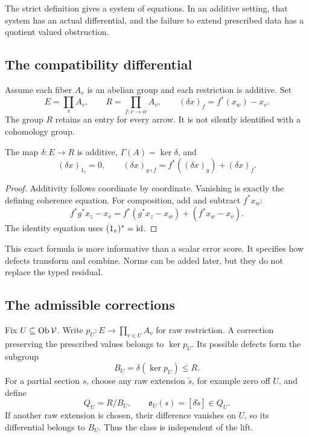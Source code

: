\label{sec:obstruction}
The strict definition gives a system of equations. In an additive setting, that system has an actual differential, and the failure to extend prescribed data has a quotient valued obstruction.

\subsection{The compatibility differential}
Assume each fiber \(A_v\) is an abelian group and each restriction is additive. Set
\[
 E=\prod_v A_v,\qquad R=\prod_{f:v\to w}A_v,
 \qquad (\delta x)_f=f^*(x_w)-x_v.
\]
The group \(R\) retains an entry for every arrow. It is not silently identified with a cohomology group.

\begin{proposition}\label{KS08}
The map \(\delta:E\to R\) is additive, \(\Gamma(A)=\ker\delta\), and
\[
 (\delta x)_{1_v}=0,\qquad
 (\delta x)_{g\circ f}=f^*((\delta x)_g)+(\delta x)_f.
\]
\end{proposition}
\begin{proof}
Additivity follows coordinate by coordinate. Vanishing is exactly the defining coherence equation. For composition, add and subtract \(f^*x_w\):
\[
 f^*g^*x_z-x_v
 =f^*(g^*x_z-x_w)+(f^*x_w-x_v).
\]
The identity equation uses \((1_v)^*=\operatorname{id}\).
\end{proof}
This exact formula is more informative than a scalar error score. It specifies how defects transform and combine. Norms can be added later, but they do not replace the typed residual.

\subsection{The admissible corrections}
Fix \(U\subseteq\operatorname{Ob}\mathcal V\). Write \(p_U:E\to\prod_{v\in U}A_v\) for raw restriction. A correction preserving the prescribed values belongs to \(\ker p_U\). Its possible defects form the subgroup
\[
 B_U=\delta(\ker p_U)\le R.
\]
For a partial section \(s\), choose any raw extension \(\widetilde s\), for example zero off \(U\), and define
\begin{equation}\label{eq:obstruction}
 Q_U=R/B_U,\qquad
 \mathfrak o_U(s)=[\delta\widetilde s]\in Q_U.
\end{equation}
If another raw extension is chosen, their difference vanishes on \(U\), so its differential belongs to \(B_U\). Thus the class is independent of the lift.

